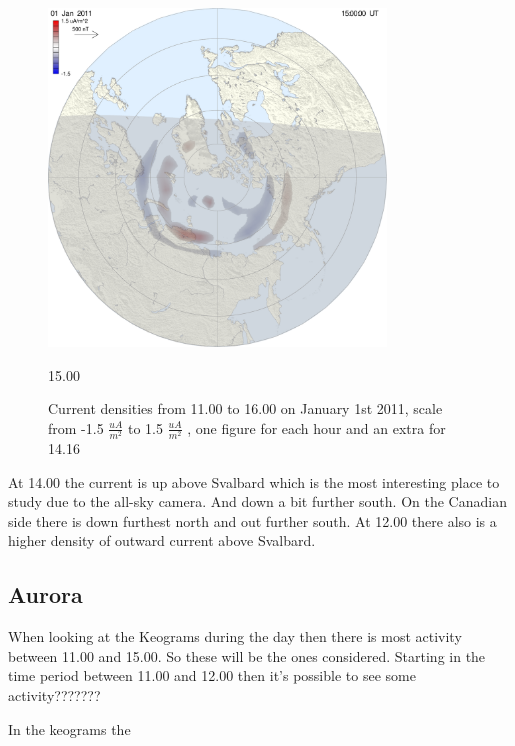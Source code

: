 \begin{figure}[ht!]
\begin{minipage}{0.33\textwidth}
\includegraphics[width=0.8\textwidth]{Figures/Ampere/1293894000north.pdf}
\caption{15.00}
\end{minipage}

\caption{Current densities from 11.00 to 16.00 on January 1st 2011, scale from -1.5 $\frac{uA}{m^2}$ to 1.5 $\frac{uA}{m^2}$ , one figure for each hour and an extra for 14.16}
\label{fig:AMPERE}
\end{figure}

At 14.00 the current is up above Svalbard which is the most interesting place to study due to the all-sky camera. And down a bit further south. On the Canadian side there is down furthest north and out further south. At 12.00 there also is a higher density of outward current above Svalbard. 


\subsection{Aurora}

When looking at the Keograms during the day then there is most activity between 11.00 and 15.00. So these will be the ones considered. Starting in the time period between 11.00 and 12.00 then it's possible to see some activity???????

In the keograms the 


